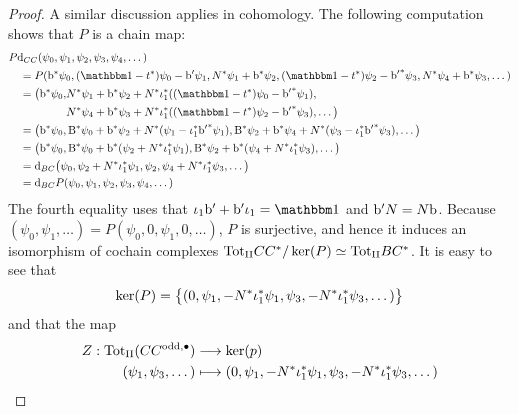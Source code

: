 \documentclass[\MainFolder/Text.tex]{subfiles}
\begin{document}
\begin{proof}
A similar discussion applies in cohomology. The following computation shows that $P$ is a chain map:
\begin{align*}
 &P \Dd_{\LodCycBi}(\psi_0,\psi_1,\psi_2, \psi_3, \psi_4,\dotsc) \\
 &\quad = P(\Hd^*\psi_0,(\Id-\CycPermOp^*)\psi_0 - \Hd'\psi_1,\CountOp^*\psi_1+ \Hd^*\psi_2,(\Id-\CycPermOp^*)\psi_2 - {\Hd'}^*\psi_3, \CountOp^*\psi_4 + \Hd^*\psi_3, \dotsc ) \\
 &\quad = \begin{aligned}[t]
  \bigl(\Hd^*\psi_0, & \CountOp^*\psi_1 + \Hd^*\psi_2 + \CountOp^*\InsOneOp_1^*((\Id-\CycPermOp^*)\psi_0 - {\Hd'}^*\psi_1), \\
  & \CountOp^*\psi_4 + \Hd^*\psi_3+ \CountOp^*\InsOneOp_1^*((\Id-\CycPermOp^*)\psi_2 - {\Hd'}^*\psi_3),\dotsc\bigr)
 \end{aligned} \\
 &\quad=\begin{aligned}[t]
 \bigl(\Hd^*\psi_0, \Cd^* \psi_0 + \Hd^* \psi_2 + \CountOp^*(\psi_1 - \InsOneOp_1^*{\Hd'}^* \psi_1), \Cd^* \psi_2 + \Hd^* \psi_4 + \CountOp^*(\psi_3 - \InsOneOp_1^*{\Hd'}^* \psi_3),\dotsc  \bigr)
\end{aligned}\\
&\quad = \bigl(\Hd^*\psi_0, \Cd^*\psi_0 + \Hd^*(\psi_2 + \CountOp^*\InsOneOp_1^* \psi_1), \Cd^*\psi_2 + \Hd^*(\psi_4 + \CountOp^*\InsOneOp_1^* \psi_3), \dotsc \bigr) \\
&\quad = \Dd_{\ConCycBi}\bigl(\psi_0,\psi_2 + \CountOp^*\InsOneOp_1^*\psi_1, \psi_2, \psi_4 + \CountOp^*\InsOneOp_1^*\psi_3,\dotsc\bigr)\\
&\quad = \Dd_{\ConCycBi} P (\psi_0,\psi_1,\psi_2,\psi_3,\psi_4,\dotsc)
\end{align*}
The fourth equality uses that $\InsOneOp_1 \Hd' + \Hd' \InsOneOp_1 = \Id$ and $\mathrm{b}'N = N\mathrm{b}$. Because $(\psi_0,\psi_1,\dotsc) = P(\psi_0,0,\psi_1,0,\dotsc )$, $P$ is surjective, and hence it induces an isomorphism of cochain complexes ${\mathrm{Tot}_{\mathrm{II}}} CC^*/\ker(P) \simeq {\mathrm{Tot}_{\mathrm{II}}} BC^*$.  It is easy to see that 
\[ \ker(P) = \bigl\{(0,\psi_1,-N^*\iota_1^*\psi_1,\psi_3,-N^*\iota_1^*\psi_3,\dotsc)\bigr\} \]
and that the map
\begin{align*}
Z: {\mathrm{Tot}_{\mathrm{II}}}(CC^{\mathrm{odd},\bullet}) &\longrightarrow \ker(p) \\
(\psi_1, \psi_3, \dotsc) &\longmapsto (0 ,\psi_1, -N^* \iota_1^* \psi_1, \psi_3, -N^* \iota_1^* \psi_3, \dotsc )
\end{align*}

\end{proof}
\end{document}
